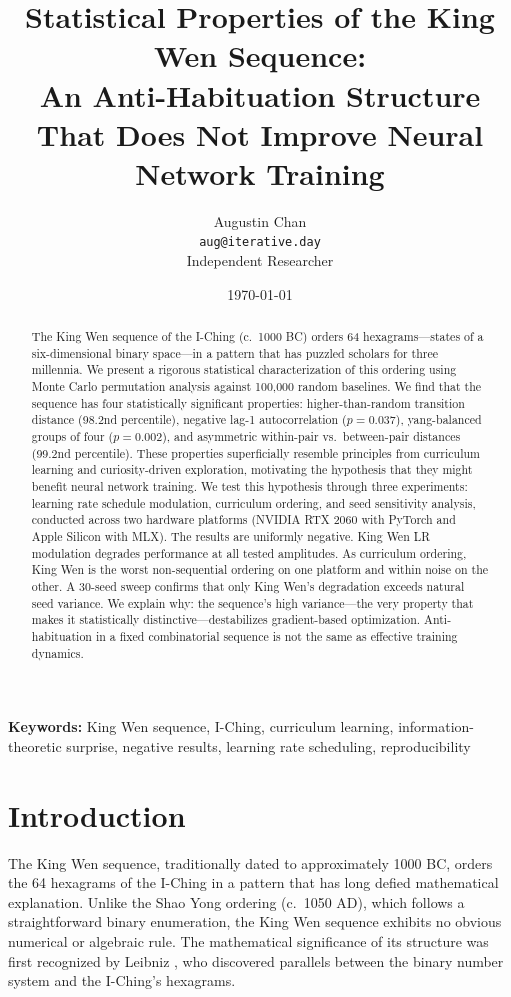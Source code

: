 \documentclass{article}
\title{Statistical Properties of the King Wen Sequence:\\An Anti-Habituation Structure That Does Not Improve Neural Network Training}
\author{Augustin Chan\\
\texttt{aug@iterative.day}\\
Independent Researcher}
\date{\today}
\begin{document}
\maketitle

\begin{abstract}
The King Wen sequence of the I-Ching (c.\ 1000 BC) orders 64 hexagrams---states of a six-dimensional binary space---in a pattern that has puzzled scholars for three millennia. We present a rigorous statistical characterization of this ordering using Monte Carlo permutation analysis against 100,000 random baselines. We find that the sequence has four statistically significant properties: higher-than-random transition distance (98.2nd percentile), negative lag-1 autocorrelation ($p=0.037$), yang-balanced groups of four ($p=0.002$), and asymmetric within-pair vs.\ between-pair distances (99.2nd percentile). These properties superficially resemble principles from curriculum learning and curiosity-driven exploration, motivating the hypothesis that they might benefit neural network training. We test this hypothesis through three experiments: learning rate schedule modulation, curriculum ordering, and seed sensitivity analysis, conducted across two hardware platforms (NVIDIA RTX 2060 with PyTorch and Apple Silicon with MLX). The results are uniformly negative. King Wen LR modulation degrades performance at all tested amplitudes. As curriculum ordering, King Wen is the worst non-sequential ordering on one platform and within noise on the other. A 30-seed sweep confirms that only King Wen's degradation exceeds natural seed variance. We explain why: the sequence's high variance---the very property that makes it statistically distinctive---destabilizes gradient-based optimization. Anti-habituation in a fixed combinatorial sequence is not the same as effective training dynamics.
\end{abstract}

\textbf{Keywords:} King Wen sequence, I-Ching, curriculum learning, information-theoretic surprise, negative results, learning rate scheduling, reproducibility

\section{Introduction}\label{sec:introduction}

The King Wen sequence, traditionally dated to approximately 1000 BC, orders the 64 hexagrams of the I-Ching in a pattern that has long defied mathematical explanation. Unlike the Shao Yong ordering (c.\ 1050 AD), which follows a straightforward binary enumeration, the King Wen sequence exhibits no obvious numerical or algebraic rule. The mathematical significance of its structure was first recognized by Leibniz \cite{leibniz1703binary}, who discovered parallels between the binary number system and the I-Ching's hexagrams.
\end{document}
